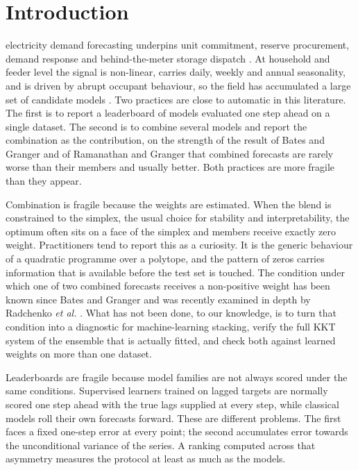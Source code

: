 \documentclass[journal]{IEEEtran}
\begin{document}
\section{Introduction}
 electricity demand forecasting underpins unit commitment, reserve procurement, demand response and behind-the-meter storage dispatch \cite{r1,r2,r13}. At household and feeder level the signal is non-linear, carries daily, weekly and annual seasonality, and is driven by abrupt occupant behaviour, so the field has accumulated a large set of candidate models \cite{r3,r5}. Two practices are close to automatic in this literature. The first is to report a leaderboard of models evaluated one step ahead on a single dataset. The second is to combine several models and report the combination as the contribution, on the strength of the result of Bates and Granger \cite{r32} and of Ramanathan and Granger \cite{r4} that combined forecasts are rarely worse than their members and usually better. Both practices are more fragile than they appear.

Combination is fragile because the weights are estimated. When the blend is constrained to the simplex, the usual choice for stability and interpretability, the optimum often sits on a face of the simplex and members receive exactly zero weight. Practitioners tend to report this as a curiosity. It is the generic behaviour of a quadratic programme over a polytope, and the pattern of zeros carries information that is available before the test set is touched. The condition under which one of two combined forecasts receives a non-positive weight has been known since Bates and Granger \cite{r32} and was recently examined in depth by Radchenko \emph{et al.} \cite{r33}. What has not been done, to our knowledge, is to turn that condition into a diagnostic for machine-learning stacking, verify the full KKT system of the ensemble that is actually fitted, and check both against learned weights on more than one dataset.

Leaderboards are fragile because model families are not always scored under the same conditions. Supervised learners trained on lagged targets are normally scored one step ahead with the true lags supplied at every step, while classical models roll their own forecasts forward. These are different problems. The first faces a fixed one-step error at every point; the second accumulates error towards the unconditional variance of the series. A ranking computed across that asymmetry measures the protocol at least as much as the models.
\end{document}
